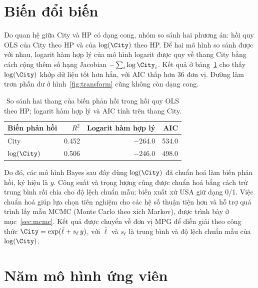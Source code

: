 \documentclass[12pt,a4paper]{report}
\begin{document}
\section{Biến đổi biến}
\label{sec:transform}

Do quan hệ giữa City và HP có dạng cong, nhóm so sánh hai phương án: hồi quy OLS
của City theo HP và của $\log(\City)$ theo HP. Để hai mô hình so sánh được với
nhau, logarit hàm hợp lý của mô hình logarit được quy về thang City bằng cách
cộng thêm số hạng Jacobian $-\sum_i \log \City_i$. Kết quả ở
bảng~\ref{tab:transform} cho thấy $\log(\City)$ khớp dữ liệu tốt hơn hẳn, với
AIC thấp hơn 36 đơn vị. Đường làm trơn phần dư ở hình~\ref{fig:transform} cũng
không còn dạng cong.

\begin{table}[tp]
  \centering
  \caption{So sánh hai thang của biến phản hồi trong hồi quy OLS theo HP;
    logarit hàm hợp lý và AIC tính trên thang City.}
  \label{tab:transform}
  \begin{tabular}{lrrr}
    \toprule
    Biến phản hồi & $R^2$ & Logarit hàm hợp lý & AIC \\
    \midrule
    City         & \num{0.452} & \num{-264.0} & \num{534.0} \\
    $\log(\City)$ & \num{0.506} & \num{-246.0} & \num{498.0} \\
    \bottomrule
  \end{tabular}
\end{table}


Do đó, các mô hình Bayes sau đây dùng $\log(\City)$ đã chuẩn hoá làm biến phản
hồi, ký hiệu là $y$. Công suất và trọng lượng cũng được chuẩn hoá bằng cách
trừ trung bình rồi chia cho độ lệch chuẩn mẫu; biến xuất xứ USA giữ dạng 0/1.
Việc chuẩn hoá giúp lựa chọn tiên nghiệm cho các hệ số thuận tiện hơn và hỗ trợ
quá trình lấy mẫu MCMC (Monte Carlo theo xích Markov), được trình bày ở
mục~\ref{sec:mcmc}. Kết quả được chuyển về đơn vị MPG để diễn giải theo công thức
$\City = \exp(\bar{\ell} + s_\ell\, y)$, với $\bar{\ell}$ và $s_\ell$ là trung
bình và độ lệch chuẩn mẫu của $\log(\City)$.

\section{Năm mô hình ứng viên}
\label{sec:candidates}
\end{document}
